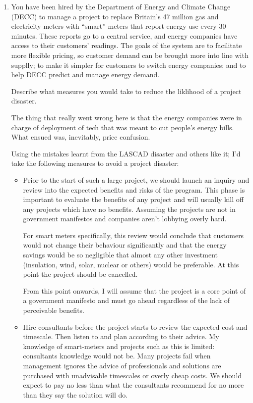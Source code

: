 \documentclass[10pt,\jkfside,a4paper]{article}
\begin{document}
\begin{enumerate}
\begin{enumerate}
\begin{enumerate}[label=(\roman*)]
\end{enumerate}

\item You have been hired by the Department of Energy and Climate Change (DECC) to manage a project to replace 
Britain's 47 million gas and electricity meters with ``smart'' meters that report energy use 
every 30 minutes. These reports go to a central service, and energy companies have access to their customers' 
readings. The goals of the system are to facilitate more flexible pricing, so customer demand can be brought 
more into line with supplly; to make it simpler for customers to switch energy companies; and to help DECC 
predict and manage energy demand. 

Describe what measures you would take to reduce the liklihood of a project disaster.

{\color{blue} The thing that really went wrong here is that the energy companies were in charge of deployment of tech
 that was meant to cut people's energy bills. What ensued was, inevitably, price confusion.}

Using the mistakes learnt from the LASCAD disaster and others like it; I'd take the following measures to
avoid a project disaster:

\begin{itemize}

\item Prior to the start of such a large project, we should launch an inquiry and review into the expected
benefits and risks of the program. This phase is important to evaluate the benefits of any project and will 
usually kill off any projects which have no benefits. Assuming the projects are not in government manifestos 
and companies aren't lobbying overly hard.

For smart meters specifically, this review would conclude that customers would not change their behaviour 
significantly and that the energy savings would be so negligible that almost any other investment (insulation, 
wind, solar, nuclear or others) would be preferable. At this point the project should be cancelled.

From this point onwards, I will assume that the project is a core point of a government manifesto and 
must go ahead regardless of the lack of perceivable benefits.

\item Hire consultants before the project starts to review the expected cost and timescale. Then listen to 
and plan according to their advice. My knowledge of smart-meters and projects such as this is limited: 
consultants knowledge would not be. Many projects fail when management ignores the advice of professionals and 
solutions are purchased with unadvisable timescales or overly cheap costs. We should expect to 
pay no less than what the consultants recommend for no more than they say the solution will do.


\end{itemize}
\end{enumerate}
\end{enumerate}
\end{document}
